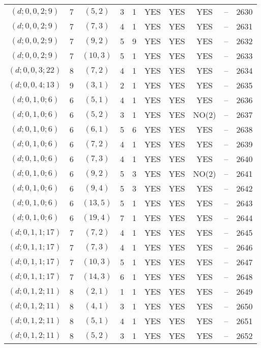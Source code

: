 \begin{longtable}{|c|c|c|c|c|c|c|c|c|c|}
$(d; 0, 0, 2; 9)$ & 7 & $(5, 2)$ & 3 & 1 & YES & YES & YES & -- & 2630\\
$(d; 0, 0, 2; 9)$ & 7 & $(7, 3)$ & 4 & 1 & YES & YES & YES & -- & 2631\\
$(d; 0, 0, 2; 9)$ & 7 & $(9, 2)$ & 5 & 9 & YES & YES & YES & -- & 2632\\
$(d; 0, 0, 2; 9)$ & 7 & $(10, 3)$ & 5 & 1 & YES & YES & YES & -- & 2633\\
$(d; 0, 0, 3; 22)$ & 8 & $(7, 2)$ & 4 & 1 & YES & YES & YES & -- & 2634\\
$(d; 0, 0, 4; 13)$ & 9 & $(3, 1)$ & 2 & 1 & YES & YES & YES & -- & 2635\\
$(d; 0, 1, 0; 6)$ & 6 & $(5, 1)$ & 4 & 1 & YES & YES & YES & -- & 2636\\
$(d; 0, 1, 0; 6)$ & 6 & $(5, 2)$ & 3 & 1 & YES & YES & NO(2) & -- & 2637\\
$(d; 0, 1, 0; 6)$ & 6 & $(6, 1)$ & 5 & 6 & YES & YES & YES & -- & 2638\\
$(d; 0, 1, 0; 6)$ & 6 & $(7, 2)$ & 4 & 1 & YES & YES & YES & -- & 2639\\
$(d; 0, 1, 0; 6)$ & 6 & $(7, 3)$ & 4 & 1 & YES & YES & YES & -- & 2640\\
$(d; 0, 1, 0; 6)$ & 6 & $(9, 2)$ & 5 & 3 & YES & YES & NO(2) & -- & 2641\\
$(d; 0, 1, 0; 6)$ & 6 & $(9, 4)$ & 5 & 3 & YES & YES & YES & -- & 2642\\
$(d; 0, 1, 0; 6)$ & 6 & $(13, 5)$ & 5 & 1 & YES & YES & YES & -- & 2643\\
$(d; 0, 1, 0; 6)$ & 6 & $(19, 4)$ & 7 & 1 & YES & YES & YES & -- & 2644\\
$(d; 0, 1, 1; 17)$ & 7 & $(7, 2)$ & 4 & 1 & YES & YES & YES & -- & 2645\\
$(d; 0, 1, 1; 17)$ & 7 & $(7, 3)$ & 4 & 1 & YES & YES & YES & -- & 2646\\
$(d; 0, 1, 1; 17)$ & 7 & $(10, 3)$ & 5 & 1 & YES & YES & YES & -- & 2647\\
$(d; 0, 1, 1; 17)$ & 7 & $(14, 3)$ & 6 & 1 & YES & YES & YES & -- & 2648\\
$(d; 0, 1, 2; 11)$ & 8 & $(2, 1)$ & 1 & 1 & YES & YES & YES & -- & 2649\\
$(d; 0, 1, 2; 11)$ & 8 & $(4, 1)$ & 3 & 1 & YES & YES & YES & -- & 2650\\
$(d; 0, 1, 2; 11)$ & 8 & $(5, 1)$ & 4 & 1 & YES & YES & YES & -- & 2651\\
$(d; 0, 1, 2; 11)$ & 8 & $(5, 2)$ & 3 & 1 & YES & YES & YES & -- & 2652\\

\end{longtable}

